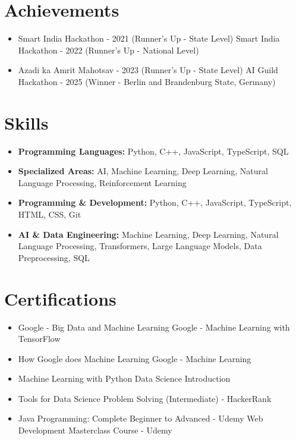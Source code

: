 \documentclass[a4paper,10pt]{article}
\begin{document}
\section*{Achievements}
\begin{itemize}
\item Smart India Hackathon - 2021 (Runner's Up - State Level) \hfill Smart India Hackathon - 2022 (Runner's Up - National Level)
\item Azadi ka Amrit Mahotsav - 2023 (Runner's Up - State Level) \hfill AI Guild Hackathon - 2025 (Winner - Berlin and Brandenburg State, Germany)
\end{itemize}

\section*{Skills}
\begin{itemize}
  \item \textbf{Programming Languages:} Python, C++, JavaScript, TypeScript, SQL
  \item \textbf{Specialized Areas:} AI, Machine Learning, Deep Learning, Natural Language Processing, Reinforcement Learning
  \item \textbf{Programming \& Development:} Python, C++, JavaScript, TypeScript, HTML, CSS, Git
  \item \textbf{AI \& Data Engineering:} Machine Learning, Deep Learning, Natural Language Processing, Transformers, Large Language Models, Data Preprocessing, SQL
\end{itemize}

\section*{Certifications}
\begin{itemize}
\item Google - Big Data and Machine Learning \hfill Google - Machine Learning with TensorFlow
\item How Google does Machine Learning \hfill Google - Machine Learning
\item Machine Learning with Python \hfill Data Science Introduction
\item Tools for Data Science \hfill Problem Solving (Intermediate) - HackerRank
\item Java Programming: Complete Beginner to Advanced - Udemy \hfill Web Development Masterclass Course - Udemy
\end{itemize}
\end{document}
